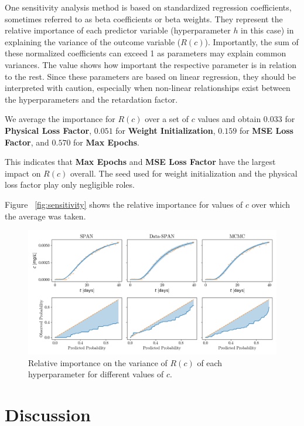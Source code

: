 One sensitivity analysis method is based on standardized regression coefficients, sometimes referred to as beta coefficients or beta weights. They represent the relative importance of each predictor variable (hyperparameter $h$ in this case) in explaining the variance of the outcome variable ($R(c)$).
Importantly, the sum of these normalized coefficients can exceed 1 as parameters may explain common variances. The value shows how important the respective parameter is in relation to the rest.
Since these parameters are based on linear regression, they should be interpreted with caution, especially when non-linear relationships exist between the hyperparameters and the retardation factor.

We average the importance for $R(c)$ over a set of $c$ values and obtain $0.033$ for \textbf{Physical Loss Factor}, $0.051$ for \textbf{Weight Initialization}, $0.159$ for \textbf{MSE Loss Factor}, and $0.570$ for \textbf{Max Epochs}.

This indicates that \textbf{Max Epochs} and \textbf{MSE Loss Factor} have the largest impact on $R(c)$ overall. The seed used for weight initialization and the physical loss factor play only negligible roles.

Figure ~\vref{fig:sensitivity} shows the relative importance for values of $c$ over which the average was taken.


\begin{figure}[h]
    \centering
    \includegraphics{figs/sensitivity.png}
    \caption{Relative importance on the variance of $R(c)$ of each hyperparameter for different values of $c$.}
    \label{fig:sensitivity}
\end{figure}



\section{Discussion}
